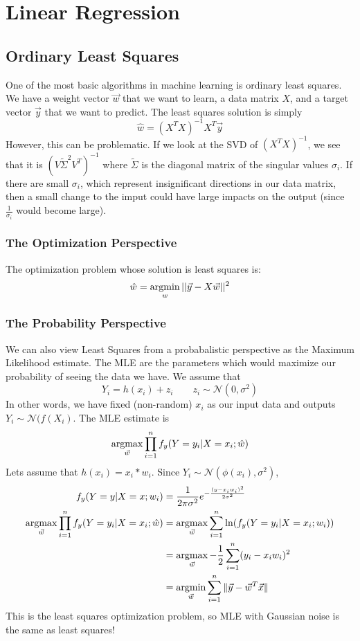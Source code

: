 \section{Linear Regression}
\subsection{Ordinary Least Squares}
One of the most basic algorithms in machine learning is ordinary least squares. We have a weight vector $\vec{w}$ that we want to learn, a data matrix $X$, and a target vector $\vec{y}$ that we want to predict. 
The least squares solution is simply
\[
  \hat{w} = (X^TX)^{-1}X^T\vec{y}
\]
However, this can be problematic. If we look at the SVD of $(X^TX)^{-1}$, we see that it is $(V\tilde{\Sigma}^2V^T)^{-1}$ where $\tilde{\Sigma}$ is the diagonal matrix of the singular values $\sigma_i$. If there are small $\sigma_i$, which represent insignificant directions in our data matrix, then a small change to the imput could have large impacts on the output (since $\frac{1}{\sigma_i}$ would become large).
\subsubsection{The Optimization Perspective}
The optimization problem whose solution is least squares is:
\[
  \hat{w} = \operatorname*{argmin}_{w} ||\vec{y} - X\vec{w}||^2
\]
\subsubsection{The Probability Perspective}
We can also view Least Squares from a probabalistic perspective as the Maximum Likelihood estimate. The MLE are the parameters which would maximize our probability of seeing the data we have. We assume that $$Y_i = h(x_i)+z_i\qquad z_i\sim \mathcal{N}(0, \sigma^2)$$
In other words, we have fixed (non-random) $x_i$ as our input data and outputs $Y_i\sim\mathcal{N}(f(X_i)$. The MLE estimate is $$\operatorname*{argmax}_{\vec{w}}\prod_{i=1}^nf_y(Y=y_i|X=x_i;\hat{w})$$
Lets assume that $h(x_i) = x_i * w_i$. Since $Y_i\sim\mathcal{N}(\phi(x_i), \sigma^2)$,
\begin{align*}
f_y(Y=y|X=x; w_i) &= \frac{1}{2\pi\sigma^2}e^{-\frac{(y-x_iw_i)^2}{2\sigma^2}}\\
\operatorname*{argmax}_{\vec{w}}\prod_{i=1}^nf_y(Y=y_i|X=x_i;\hat{w}) &= \operatorname*{argmax}_{\vec{w}}\sum_{i=1}^{n}\ln(f_y(Y=y_i|X=x_i; w_i))\\
&= \operatorname*{argmax}_{\vec{w}}-\frac{1}{2}\sum_{i=1}^n(y_i-x_iw_i)^2\\
&= \operatorname*{argmin}_{\vec{w}}\sum_{i=1}^n\|\vec{y}-\vec{w}^T\vec{x}\|
\end{align*}
This is the least squares optimization problem, so MLE with Gaussian noise is the same as least squares!
